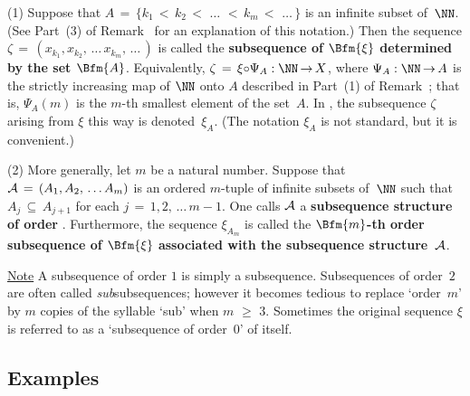 \V

            (1) Suppose that $A \,=\, \{k_{1}\,<\,k_{2}\,<\,\,{\ldots}\,\,<\,k_{m}\,<\,\,{\ldots}\,\}$ is an infinite subset of~${\NN}$.
    (See Part~(3) of Remark~ for an explanation of this notation.)
    Then the sequence ${\zeta} \,=\, (x_{k_{1}}, x_{k_{2}},\,{\ldots}\,x_{k_{m}},\,{\ldots}\,)$
    is called the {\bf subsequence of $\Bfm{{\xi}}$ determined by the set $\Bfm{A}$}.
     Equivalently, ${\zeta} \,=\, {\xi}{\circ}{\Psi}_{A}:{\NN} \,{\rightarrow}\, X$,
    where ${\Psi}_{A}:{\NN} \,{\rightarrow}\, A$ is the strictly increasing map of ${\NN}$ onto $A$ described in Part~(1) of Remark~;
    that is, ${\Psi}_{A}(m)$ is the $m$-th smallest element of the set~$A$. In {\ThisText},
    the subsequence ${\zeta}$ arising from ${\xi}$ this way is denoted~${\xi}_{A}$.
    (The notation ${\xi}_{A}$ is not standard, but it is convenient.)

\V

        (2) More generally, let $m$ be a natural number. Suppose that ${\cal A} \,=\, (A_{1}, A_{2},\,{\ldots}\,A_{m})$
    is an ordered $m$-tuple of infinite subsets of~${\NN}$ such that $A_{j} \,{\subseteq}\, A_{j+1}$ for each $j \,=\, 1,2,\,{\ldots}\,m-1$.
    One calls ${\cal A}$ a {\bf subsequence structure of order }.
        Furthermore, the sequence ${\xi}_{A_{m}}$ is called the {\bf $\Bfm{m}$-th order subsequence of $\Bfm{{\xi}}
    $ associated with the subsequence structure~${\cal A}$}.

\V

        \underline{Note} A subsequence of order $1$ is simply a subsequence. Subsequences of order~$2$ are often called {\em sub}subsequences;
    however it becomes tedious to replace `order~$m$' by $m$ copies of the syllable `sub' when $m\,\,{\geq}\,\,3$.
    Sometimes the original sequence ${\xi}$ is referred to as a `subsequence of order~$0$' of itself.

\VV

        \subsection{\small{{\bf Examples}}}
        \label{ExampA40.41A}

\V

